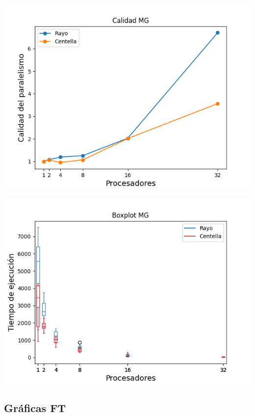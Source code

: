 \begin{center}
 \centering
 \begin{minipage}[b]{.49\textwidth}
  \includegraphics[width=1\linewidth]{plots/calidad-mg.png}
 \end{minipage}
 \begin{minipage}[b]{.49\textwidth}
  \includegraphics[width=1\linewidth]{plots/boxplot-mg.png}
 \end{minipage}
\end{center}

\newpage

\subsection{Gráficas FT}

